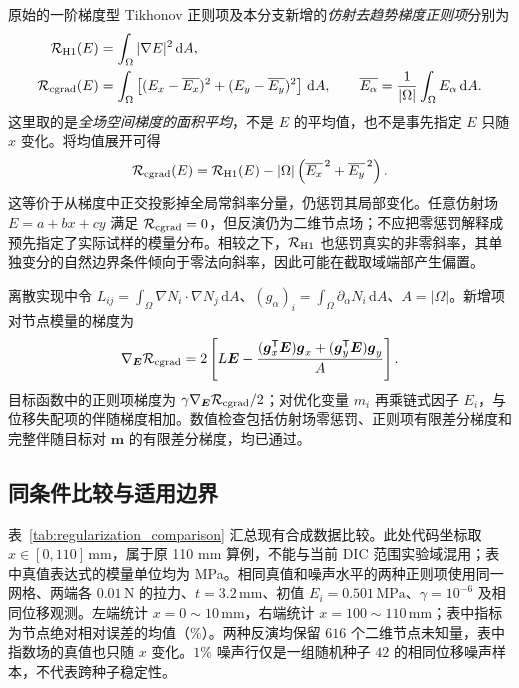 \documentclass[11pt,a4paper]{ctexart}
\begin{document}
原始的一阶梯度型 Tikhonov 正则项及本分支新增的\emph{仿射去趋势梯度正则项}分别为
\begin{align}
 \mathcal R_{\rm H1}(E)&=\int_\Omega |\nabla E|^2\,\mathrm dA,
 \\
 \mathcal R_{\rm cgrad}(E)&=\int_\Omega
 \left[(E_x-\overline{E_x})^2+(E_y-\overline{E_y})^2\right]\,\mathrm dA,
 \qquad
 \overline{E_\alpha}=\frac{1}{|\Omega|}\int_\Omega E_\alpha\,\mathrm dA.
\end{align}
这里取的是\emph{全场空间梯度的面积平均}，不是 $E$ 的平均值，也不是事先指定 $E$ 只随 $x$ 变化。将均值展开可得
\begin{equation}\label{eq:regularizer_projection}
 \mathcal R_{\rm cgrad}(E)=\mathcal R_{\rm H1}(E)
 -|\Omega|\left(\overline{E_x}^{\,2}+\overline{E_y}^{\,2}\right).
\end{equation}
这等价于从梯度中正交投影掉全局常斜率分量，仍惩罚其局部变化。任意仿射场 $E=a+bx+cy$ 满足 $\mathcal R_{\rm cgrad}=0$，但反演仍为二维节点场；不应把零惩罚解释成预先指定了实际试样的模量分布。相较之下，$\mathcal R_{\rm H1}$ 也惩罚真实的非零斜率，其单独变分的自然边界条件倾向于零法向斜率，因此可能在截取域端部产生偏置。

离散实现中令 $L_{ij}=\int_\Omega\nabla N_i\!\cdot\!\nabla N_j\,\mathrm dA$、$(g_\alpha)_i=\int_\Omega\partial_\alpha N_i\,\mathrm dA$、$A=|\Omega|$。新增项对节点模量的梯度为
\begin{equation}
 \nabla_{\boldsymbol E}\mathcal R_{\rm cgrad}
 =2\left[L\boldsymbol E-
 \frac{(\boldsymbol g_x^{\mathsf T}\boldsymbol E)\boldsymbol g_x+
       (\boldsymbol g_y^{\mathsf T}\boldsymbol E)\boldsymbol g_y}{A}\right].
\end{equation}
目标函数中的正则项梯度为 $\gamma\nabla_{\boldsymbol E}\mathcal R_{\rm cgrad}/2$；对优化变量 $m_i$ 再乘链式因子 $E_i$，与位移失配项的伴随梯度相加。数值检查包括仿射场零惩罚、正则项有限差分梯度和完整伴随目标对 $\boldsymbol m$ 的有限差分梯度，均已通过。

\subsection{同条件比较与适用边界}
表~\ref{tab:regularization_comparison} 汇总现有合成数据比较。此处代码坐标取 $x\in[0,110]\,\mathrm{mm}$，属于原 110 mm 算例，不能与当前 DIC 范围实验域混用；表中真值表达式的模量单位均为 MPa。相同真值和噪声水平的两种正则项使用同一网格、两端各 $0.01\,\mathrm N$ 的拉力、$t=3.2\,\mathrm{mm}$、初值 $E_i=0.501\,\mathrm{MPa}$、$\gamma=10^{-6}$ 及相同位移观测。左端统计 $x=0\sim10\,\mathrm{mm}$，右端统计 $x=100\sim110\,\mathrm{mm}$；表中指标为节点绝对相对误差的均值（\%）。两种反演均保留 $616$ 个二维节点未知量，表中指数场的真值也只随 $x$ 变化。$1\%$ 噪声行仅是一组随机种子 $42$ 的相同位移噪声样本，不代表跨种子稳定性。
\end{document}
